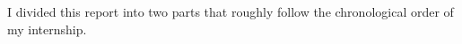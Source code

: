 

I divided this report into two parts that roughly follow the chronological order of my internship.

